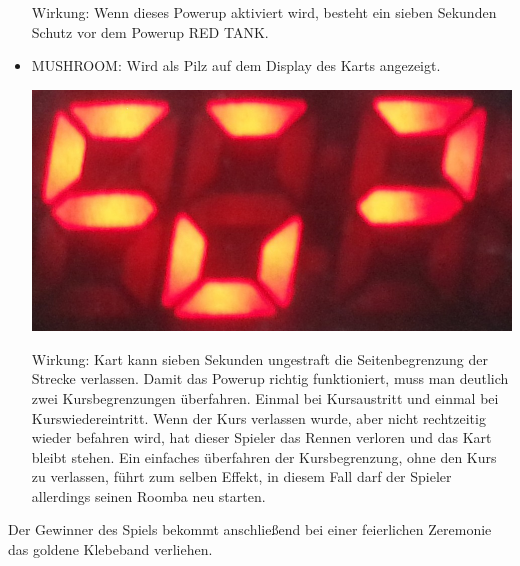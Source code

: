 \begin{itemize}
	Wirkung: Wenn dieses Powerup aktiviert wird, besteht ein sieben Sekunden Schutz vor  
	dem Powerup RED TANK. 
	\item MUSHROOM: Wird als Pilz auf dem Display des Karts angezeigt. 
	
	\begin{center}
		\includegraphics[scale=0.2]{Bilder/MUSHROOM}
	\end{center}
	
	Wirkung: Kart kann sieben Sekunden ungestraft die Seitenbegrenzung der Strecke  
	verlassen. Damit das Powerup richtig funktioniert, muss man deutlich zwei 	
	Kursbegrenzungen überfahren. Einmal bei Kursaustritt und einmal bei Kurswiedereintritt. 
	Wenn der Kurs verlassen wurde, aber nicht rechtzeitig wieder befahren wird, 
	hat dieser Spieler das Rennen verloren und das Kart bleibt stehen. Ein einfaches 
	überfahren der Kursbegrenzung, ohne den Kurs zu verlassen, führt zum selben Effekt, in 
	diesem Fall darf der Spieler allerdings seinen Roomba neu starten.    		
\end{itemize}

Der Gewinner des Spiels bekommt anschließend bei einer feierlichen Zeremonie das goldene Klebeband verliehen. 


 



































